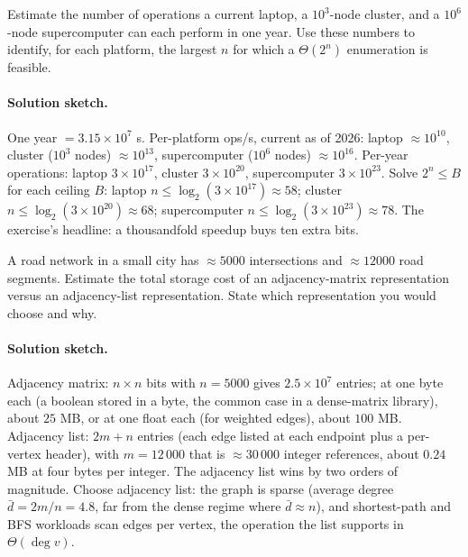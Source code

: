 \begin{exercise}
Estimate the number of operations a current laptop, a $10^{3}$-node
cluster, and a $10^{6}$-node supercomputer can each perform in one
year. Use these numbers to identify, for each platform, the largest
$n$ for which a $\Theta(2^{n})$ enumeration is feasible.
\end{exercise}

\paragraph{Solution sketch.}
One year $= 3.15 \times 10^{7}$ s. Per-platform ops/s, current as
of 2026: laptop $\approx 10^{10}$, cluster ($10^{3}$ nodes)
$\approx 10^{13}$, supercomputer ($10^{6}$ nodes) $\approx 10^{16}$.
Per-year operations: laptop $3 \times 10^{17}$, cluster $3 \times
10^{20}$, supercomputer $3 \times 10^{23}$. Solve $2^{n} \leq B$
for each ceiling $B$: laptop $n \leq \log_{2}(3 \times 10^{17})
\approx 58$; cluster $n \leq \log_{2}(3 \times 10^{20}) \approx
68$; supercomputer $n \leq \log_{2}(3 \times 10^{23}) \approx 78$.
The exercise's headline: a thousandfold speedup buys ten extra
bits.

\begin{exercise}
A road network in a small city has $\approx 5000$ intersections
and $\approx 12000$ road segments. Estimate the total storage cost
of an adjacency-matrix representation versus an adjacency-list
representation. State which representation you would choose and
why.
\end{exercise}

\paragraph{Solution sketch.}
Adjacency matrix: $n \times n$ bits with $n = 5000$ gives $2.5
\times 10^{7}$ entries; at one byte each (a boolean stored in a
byte, the common case in a dense-matrix library), about $25$ MB,
or at one float each (for weighted edges), about $100$ MB.
Adjacency list: $2 m + n$ entries (each edge listed at each
endpoint plus a per-vertex header), with $m = 12\,000$ that is
$\approx 30\,000$ integer references, about $0.24$ MB at four
bytes per integer. The adjacency list wins by two orders of
magnitude. Choose adjacency list: the graph is sparse (average
degree $\bar{d} = 2 m / n = 4.8$, far from the dense regime where
$\bar{d} \approx n$), and shortest-path and BFS workloads scan
edges per vertex, the operation the list supports in $\Theta(\deg
v)$.


